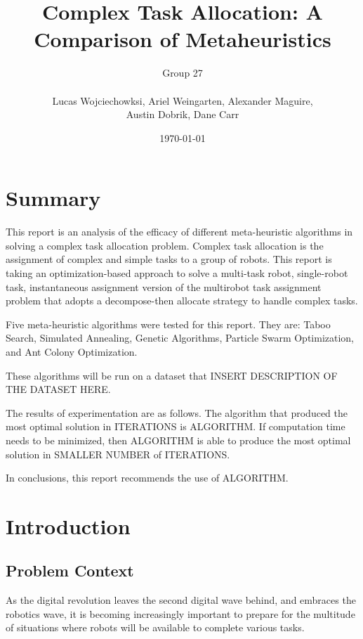 \documentclass[a4paper]{article}
\title{Complex Task Allocation: A Comparison of Metaheuristics}
\author{
	Group 27 \\
	\\
	Lucas Wojciechowksi, Ariel Weingarten, Alexander Maguire, \\
	Austin Dobrik, Dane Carr}
\date{\today}
\begin{document}
\maketitle


\section*{Summary}
This report is an analysis of the efficacy of different meta-heuristic algorithms in solving a complex task allocation problem.
Complex task allocation is the assignment of complex and simple tasks to a group of robots. This report is taking an optimization-based approach to solve a multi-task robot, single-robot task, instantaneous assignment version of the multirobot task assignment problem that adopts a decompose-then allocate strategy to handle complex tasks.

Five meta-heuristic algorithms were tested for this report. They are: Taboo Search, Simulated Annealing, Genetic Algorithms, Particle Swarm Optimization, and Ant Colony Optimization.

These algorithms will be run on a dataset that INSERT DESCRIPTION OF THE DATASET HERE.

The results of experimentation are as follows. The algorithm that produced the most optimal solution in ITERATIONS is ALGORITHM.
If computation time needs to be minimized, then ALGORITHM is able to produce the most optimal solution in SMALLER NUMBER of ITERATIONS.

In conclusions, this report recommends the use of ALGORITHM.

\section{Introduction}
\subsection{Problem Context}
As the digital revolution leaves the second digital wave behind, and embraces the robotics wave\cite{Talk}, it is becoming increasingly important to prepare for the multitude of situations where robots will be available to complete various tasks.
\end{document}
